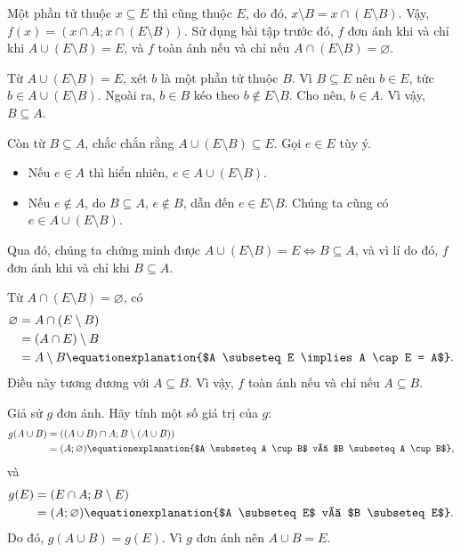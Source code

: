 \solution 

\resetSubexercise Một phần tử thuộc $x \subseteq E$ thì cũng thuộc $E$, do đó, $x \setminus B = x \cap (E \setminus B)$. Vậy, $f(x) = (x \cap A; x \cap (E \setminus B))$. Sử dụng bài tập trước đó, $f$ đơn ánh khi và chỉ khi $A \cup (E \setminus B) = E$, và $f$ toàn ánh nếu và chỉ nếu $A \cap (E \setminus B) = \varnothing$.

Từ $A \cup (E \setminus B) = E$, xét $b$ là một phần tử thuộc $B$. Vì $B \subseteq E$ nên $b \in E$, tức $b \in A \cup (E \setminus B)$. Ngoài ra, $b \in B$ kéo theo $b \notin E \setminus B$. Cho nên, $b \in A$. Vì vậy, $B \subseteq A$.

Còn từ $B \subseteq A$, chắc chắn rằng $A \cup (E \setminus B) \subseteq E$. Gọi $e \in E$ tùy ý. 
\begin{itemize}
   \item Nếu $e \in A$ thì hiển nhiên, $e \in A \cup (E \setminus B)$.
   \item Nếu $e \notin A$, do $B \subseteq A$, $e \notin B$, dẫn đến $e \in E \setminus B$. Chúng ta cũng có $e \in A \cup (E \setminus B)$.
\end{itemize} 

Qua đó, chúng ta chứng minh được $A \cup (E \setminus B) = E \iff B \subseteq A$, và vì lí do đó, $f$ đơn ánh khi và chỉ khi $B \subseteq A$.

Từ $A \cap (E \setminus B) = \varnothing$, có 
\begin{align*}
   \varnothing &= A \cap (E \setminus B) \\
      &= (A \cap E) \setminus B \\
      &= A \setminus B \equationexplanation{$A \subseteq E \implies A \cap E = A$}.
\end{align*}
Điều này tương đương với $A \subseteq B$. Vì vậy, $f$ toàn ánh nếu và chỉ nếu $A \subseteq B$.

\stepSubexercise Giả sử $g$ đơn ánh. Hãy tính một số giá trị của $g$:
\begin{align*}
   g(A \cup B) &= ((A \cup B) \cap A; B \setminus (A \cup B)) \\
   &= (A; \varnothing) \equationexplanation{$A \subseteq A \cup B$ và $B \subseteq A \cup B$},
\end{align*}
và \begin{align*}
   g(E) &= (E \cap A; B \setminus E) \\
   &= (A; \varnothing) \equationexplanation{$A \subseteq E$ và $B \subseteq E$}.
\end{align*}
Do đó, $g(A \cup B) = g(E)$. Vì $g$ đơn ánh nên $A \cup B = E$.

